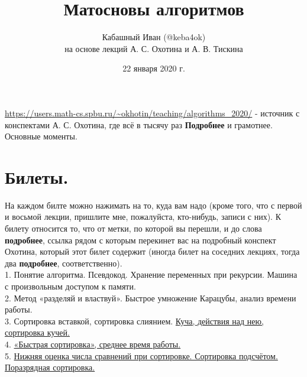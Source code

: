 \documentclass[a4paper]{article}
\title{Матосновы алгоритмов}
\author{Кабашный Иван (@keba4ok) \\ на основе лекций А. С. Охотина и А. В. Тискина}
\date{22 января 2020 г.}
\theoremstyle{indented}
\theoremstyle{definition}
\theoremstyle{remark}
\begin{document}
\newcommand{\resetexlcounters}{%
  \setcounter{exl}{0}%
} 

\newcommand{\resetremarkcounters}{%
  \setcounter{remark}{0}%
} 

\newcommand{\reseconscounters}{%
  \setcounter{cons}{0}%
} 

\newcommand{\resetall}{%
    \resetexlcounters
    \resetremarkcounters
    \reseconscounters%
}

\maketitle 

\newpage

\url{https://users.math-cs.spbu.ru/~okhotin/teaching/algorithms_2020/} - источник с конспектами А. С. Охотина, где всё в тысячу раз \textbf{Подробнее} и грамотнее. \\

\hypertarget{t1}{Основные моменты}. 
\tableofcontents

\newpage

\section{Билеты.}

На каждом билте можно нажимать на то, куда вам надо (кроме того, что с первой и восьмой лекции, пришлите мне, пожалуйста, кто-нибудь, записи с них). К билету относится то, что от метки, по которой вы перешли, и до слова \textbf{подробнее}, ссылка рядом с которым перекинет вас на подробный конспект Охотина, который этот билет содержит (иногда билет на соседних лекциях, тогда два \textbf{подробнее}, соответственно). \\

1. Понятие алгоритма. Псевдокод. Хранение переменных при рекурсии. Машина с произвольным доступом к памяти. \\

2. Метод «разделяй и властвуй». Быстрое умножение Карацубы, анализ времени работы. \\ 

3. Сортировка вставкой, сортировка слиянием. \hyperlink{d1.5}{Куча, действия над нею, сортировка кучей.} \\ 

4. \hyperlink{r1}{«Быстрая сортировка», среднее время работы.} \\ 

5. \hyperlink{t2.5}{Нижняя оценка числа сравнений при сортировке. Сортировка подсчётом. Поразрядная сортировка.} \\ 
\end{document}

